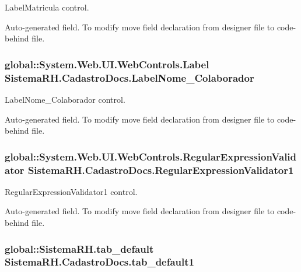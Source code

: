 LabelMatricula control. 

Auto-\/generated field. To modify move field declaration from designer file to code-\/behind file. \hypertarget{class_sistema_r_h_1_1_cadastro_docs_a05f83bf0a33b8127a9104de81cf2eebd}{
\subsubsection[{LabelNome\_\-Colaborador}]{\setlength{\rightskip}{0pt plus 5cm}global::System.Web.UI.WebControls.Label {\bf SistemaRH.CadastroDocs.LabelNome\_\-Colaborador}}}
\label{class_sistema_r_h_1_1_cadastro_docs_a05f83bf0a33b8127a9104de81cf2eebd}


LabelNome\_\-Colaborador control. 

Auto-\/generated field. To modify move field declaration from designer file to code-\/behind file. \hypertarget{class_sistema_r_h_1_1_cadastro_docs_a5e95292e8aec7a971acf5aeec2afef00}{
\subsubsection[{RegularExpressionValidator1}]{\setlength{\rightskip}{0pt plus 5cm}global::System.Web.UI.WebControls.RegularExpressionValidator {\bf SistemaRH.CadastroDocs.RegularExpressionValidator1}}}
\label{class_sistema_r_h_1_1_cadastro_docs_a5e95292e8aec7a971acf5aeec2afef00}


RegularExpressionValidator1 control. 

Auto-\/generated field. To modify move field declaration from designer file to code-\/behind file. \hypertarget{class_sistema_r_h_1_1_cadastro_docs_ae1b5d8ddeb7251752f78e171a3b7491c}{
\subsubsection[{tab\_\-default1}]{\setlength{\rightskip}{0pt plus 5cm}global::SistemaRH.tab\_\-default {\bf SistemaRH.CadastroDocs.tab\_\-default1}}}
\label{class_sistema_r_h_1_1_cadastro_docs_ae1b5d8ddeb7251752f78e171a3b7491c}


